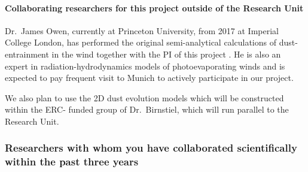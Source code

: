 \documentclass[10pt,fleqn,twoside]{article}
\begin{document}
\paragraph{Collaborating researchers for this project outside of
  the Research Unit}


Dr.\ James Owen, currently at Princeton University, from 2017 at
Imperial College London, has performed the original semi-analytical
calculations of dust-entrainment in the wind together with the PI of
this project \citep{2011MNRAS.411.1104O}. He is also an expert
in radiation-hydrodynamics models of photoevaporating winds
\citep[e.g.,][]{2010MNRAS.401.1415O, 2011MNRAS.411.1104O, 2012MNRAS.422.1880O}
and is expected to pay
frequent visit to Munich to actively participate in our project. 

We also plan to use the 2D dust evolution models which will be
constructed within the ERC- funded group of Dr.\ Birnstiel, which
will run parallel to the Research Unit. 

\subsubsection{Researchers with whom you have collaborated scientifically within the past three years}

\end{document}
